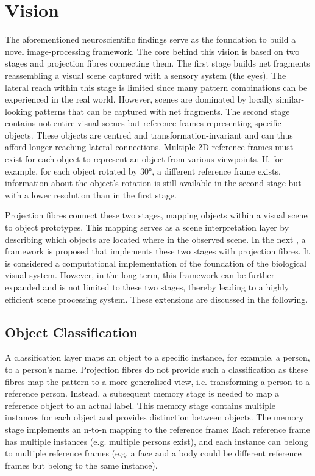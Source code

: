 \section{Vision}
The aforementioned neuroscientific findings serve as the foundation to build a novel image-processing framework.
The core behind this vision is based on two stages and projection fibres connecting them.
The first stage builds net fragments reassembling a visual scene captured with a sensory system (the eyes). The lateral reach within this stage is limited since many pattern combinations can be experienced in the real world. However, scenes are dominated by locally similar-looking patterns that can be captured with net fragments.
The second stage contains not entire visual scenes but reference frames representing specific objects. These objects are centred and transformation-invariant and can thus afford longer-reaching lateral connections.
Multiple 2D reference frames must exist for each object to represent an object from various viewpoints.
If, for example, for each object rotated by 30°, a different reference frame exists, information about the object's rotation is still available in the second stage but with a lower resolution than in the first stage.

Projection fibres connect these two stages, mapping objects within a visual scene to object prototypes.
This mapping serves as a scene interpretation layer by describing which objects are located where in the observed scene.
In the next , a framework is proposed that implements these two stages with projection fibres.
It is considered a computational implementation of the foundation of the biological visual system.
However, in the long term, this framework can be further expanded and is not limited to these two stages, thereby leading to a highly efficient scene processing system.
These extensions are discussed in the following.

\subsection{Object Classification}
A classification layer maps an object to a specific instance, for example, a person, to a person's name. Projection fibres do not provide such a classification as these fibres map the pattern to a more generalised view, i.e. transforming a person to a reference person. Instead, a subsequent memory stage is needed to map a reference object to an actual label.
This memory stage contains multiple instances for each object and provides distinction between objects. The memory stage implements an n-to-n mapping to the reference frame: Each reference frame has multiple instances (e.g. multiple persons exist), and each instance can belong to multiple reference frames (e.g. a face and a body could be different reference frames but belong to the same instance).


